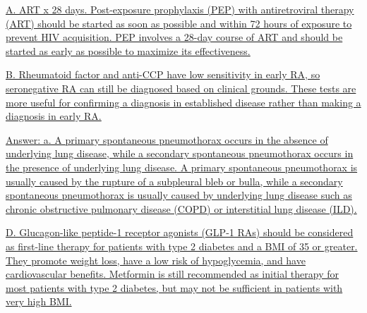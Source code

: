 \documentclass[10pt, a4paper]{article}
\begin{document}
\begin{multicols}{2}
\begin{enumerate}
 \vspace{6pt} 

\parbox{\linewidth}{\item \href{https://www.notion.so/HIV-e8425ab8632542908ec36ddeca89de55}{ A. ART x 28 days. Post-exposure prophylaxis (PEP) with antiretroviral therapy (ART) should be started as soon as possible and within 72 hours of exposure to prevent HIV acquisition. PEP involves a 28-day course of ART and should be started as early as possible to maximize its effectiveness.}} 

 \vspace{6pt} 

\parbox{\linewidth}{\item \href{https://www.notion.so/Rheumatoid-Arthritis-6a0cf88ae3804bf28deb902f66fcfa47}{ B. Rheumatoid factor and anti-CCP have low sensitivity in early RA, so seronegative RA can still be diagnosed based on clinical grounds. These tests are more useful for confirming a diagnosis in established disease rather than making a diagnosis in early RA.}} 

 \vspace{6pt} 

\parbox{\linewidth}{\item \href{https://www.notion.so/Diseases-of-the-Pleura-d3e3c9bbf58540aeb0c0f9260d62cb08}{ Answer: a. A primary spontaneous pneumothorax occurs in the absence of underlying lung disease, while a secondary spontaneous pneumothorax occurs in the presence of underlying lung disease. A primary spontaneous pneumothorax is usually caused by the rupture of a subpleural bleb or bulla, while a secondary spontaneous pneumothorax is usually caused by underlying lung disease such as chronic obstructive pulmonary disease (COPD) or interstitial lung disease (ILD).}} 

 \vspace{6pt} 

\parbox{\linewidth}{\item \href{https://www.notion.so/Overview-of-Diabetes-Management-Oral-Agents-81f832bc2167485ea86646655d911d2a}{ D. Glucagon-like peptide-1 receptor agonists (GLP-1 RAs) should be considered as first-line therapy for patients with type 2 diabetes and a BMI of 35 or greater. They promote weight loss, have a low risk of hypoglycemia, and have cardiovascular benefits. Metformin is still recommended as initial therapy for most patients with type 2 diabetes, but may not be sufficient in patients with very high BMI.}} 

 \vspace{6pt} 


\end{enumerate}
\end{multicols}
\end{document}
